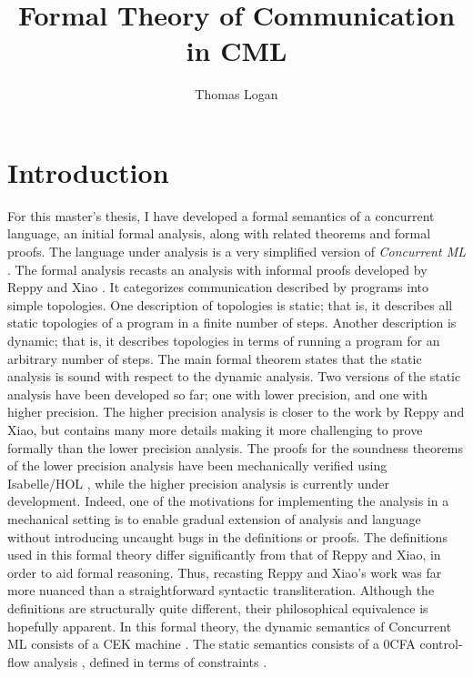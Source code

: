 \documentclass[letterpaper, 11pt]{extarticle}
\title{Formal Theory of Communication in CML}
\author{Thomas Logan}
\begin{document}
\maketitle
{}

\newpage
{}

\section{Introduction}
For this master's thesis, I have developed a formal semantics of
a concurrent language, an initial formal analysis, along with related theorems and formal 
proofs. The language under analysis is
a very simplified version of \textit{Concurrent ML} \cite{reppy2007concurrent}. The formal analysis
recasts an analysis with informal proofs developed by Reppy and Xiao \cite{reppy2007specialization}. It
categorizes communication described by programs into simple topologies. One description of
topologies is static; that is, it describes all static topologies of a program in a finite number of steps.
Another description is dynamic; that is, it describes topologies in terms of running
a program for an arbitrary number of steps. The main formal theorem states that the static
analysis is sound with respect to the dynamic analysis. Two versions of the static analysis
have been developed so far; one with lower precision, and one with higher precision. The higher
precision analysis is closer to the work by Reppy and Xiao, but contains many more details making
it more challenging to prove formally than the lower precision analysis.
The proofs for the soundness theorems of the lower precision analysis
have been mechanically verified using Isabelle/HOL \cite{nipkow2002isabelle}, while the higher precision
analysis is currently under development. Indeed, one of the motivations for implementing the analysis 
in a mechanical setting is to enable gradual extension of analysis and language without introducing
uncaught bugs in the definitions or proofs. The definitions used in this formal theory differ
significantly from that of Reppy and Xiao, in order to aid formal reasoning. Thus, recasting
Reppy and Xiao's work was far more nuanced than a straightforward
syntactic transliteration.
Although the definitions are structurally quite different,
their philosophical equivalence is hopefully apparent. 
In this formal theory, the dynamic semantics of Concurrent ML consists of 
a CEK machine \cite{felleisen1986control}. The static semantics consists of a 0CFA control-flow analysis
\cite{shivers1991control}, defined in terms of constraints \cite{nielson2015principles}.
\end{document}

